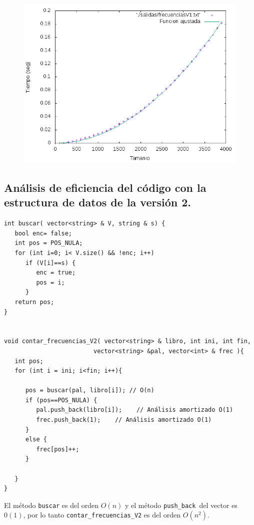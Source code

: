 \documentclass[11pt]{article}
\begin{document}
\begin{figure}[H]
\begin{center}
\includegraphics[width=12cm]{../salidas/frecuenciasV1.png}
\end{center}
\end{figure}

\subsection{Análisis de eficiencia del código con la estructura de datos de la versión 2.}

\begin{verbatim}
int buscar( vector<string> & V, string & s) {
   bool enc= false;
   int pos = POS_NULA;
   for (int i=0; i< V.size() && !enc; i++)
      if (V[i]==s) {
         enc = true;
         pos = i;
      }
   return pos;
}


void contar_frecuencias_V2( vector<string> & libro, int ini, int fin,
                         vector<string> &pal, vector<int> & frec ){
   int pos;
   for (int i = ini; i<fin; i++){

      pos = buscar(pal, libro[i]); // O(n)
      if (pos==POS_NULA) {
         pal.push_back(libro[i]);    // Análisis amortizado O(1)
         frec.push_back(1);    // Análisis amortizado O(1)
      }
      else {
         frec[pos]++;
      }

   }
}
\end{verbatim}

El método \texttt{buscar} es del orden $O(n)$ y el método \texttt{push\_back }del vector es $0(1)$, por lo tanto \texttt{contar\_frecuencias\_V2} es del orden $O(n^2)$.\\
\end{document}
